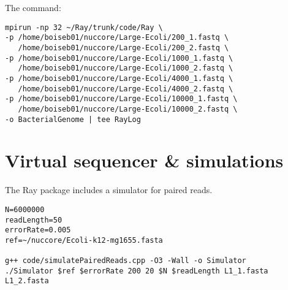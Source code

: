 \documentclass{article}
\begin{document}
The command:

\begin{verbatim}
mpirun -np 32 ~/Ray/trunk/code/Ray \
-p /home/boiseb01/nuccore/Large-Ecoli/200_1.fastq \
   /home/boiseb01/nuccore/Large-Ecoli/200_2.fastq \
-p /home/boiseb01/nuccore/Large-Ecoli/1000_1.fastq \
   /home/boiseb01/nuccore/Large-Ecoli/1000_2.fastq \
-p /home/boiseb01/nuccore/Large-Ecoli/4000_1.fastq \
   /home/boiseb01/nuccore/Large-Ecoli/4000_2.fastq \
-p /home/boiseb01/nuccore/Large-Ecoli/10000_1.fastq \
   /home/boiseb01/nuccore/Large-Ecoli/10000_2.fastq \
-o BacterialGenome | tee RayLog
\end{verbatim}

\section{Virtual sequencer \& simulations}

The Ray package includes a simulator for paired reads.

\begin{verbatim}
N=6000000
readLength=50
errorRate=0.005
ref=~/nuccore/Ecoli-k12-mg1655.fasta

g++ code/simulatePairedReads.cpp -O3 -Wall -o Simulator 
./Simulator $ref $errorRate 200 20 $N $readLength L1_1.fasta L1_2.fasta
\end{verbatim}
\end{document}
